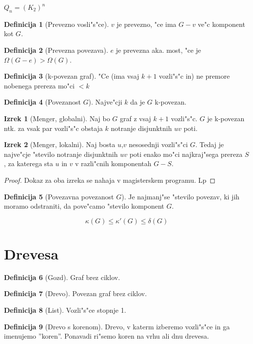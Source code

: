 \documentclass{article}
\theoremstyle{definition}
\newtheorem{definition}{Definicija}[section]
\newtheorem{theorem}{Izrek}[section]
\begin{document}
	$Q_n = (K_2)^n$
	
	\begin{definition}[Prevezno vosli"s"ce]
		$v$ je prevezno, "ce ima $G-v$ ve"c komponent kot $G$.
	\end{definition}
	\begin{definition}[Prevezna povezava]
		$e$ je prevezna aka. most, "ce je $\Omega(G-e) > \Omega(G)$.
	\end{definition}
	\begin{definition}[k-povezan graf]
		"Ce (ima vsaj $k+1$ vozli"s"c in) ne premore nobenega prereza mo"ci $< k$
	\end{definition}
	\begin{definition}[Povezanost $G$]
		Najve"cji $k$ da je $G$ k-povezan. 
	\end{definition}

	\begin{theorem}[Menger, globalni]
		Naj bo $G$ graf z vsaj $k+1$ vozli"s"c. $G$ je k-povezan ntk. za vsak par vozli"s"c obstaja $k$ notranje disjunktnih $uv$ poti.
	\end{theorem} 
	\begin{theorem}[Menger, lokalni]
		Naj bosta $u$,$v$ nesosednji vozli"s"ci $G$. Tedaj je najve"cje "stevilo notranje disjunktnih $uv$ poti enako mo"ci najkraj"sega prereza $S$, za katerega sta $u$ in $v$ v razli"cnih komponentah $G-S$.
	\end{theorem}
	\begin{proof}
		Dokaz za oba izreka se nahaja v magisterskem programu. Lp
	\end{proof}
	
	\begin{definition}[Povezavna povezanost $G$]
		Je najmanj"se "stevilo povezav, ki jih moramo odstraniti, da pove"camo "stevilo komponent $G$.
	\end{definition}

	\[ \kappa (G) \leq \kappa '(G) \leq \delta(G) \]
	
	\section{Drevesa}
	\begin{definition}[Gozd]
		Graf brez ciklov.
	\end{definition}
	\begin{definition}[Drevo]
		Povezan graf brez ciklov.
	\end{definition}
	\begin{definition}[List]
		Vozli"s"ce stopnje 1.
	\end{definition}
	\begin{definition}[Drevo s korenom]
		Drevo, v katerm izberemo vozli"s"ce in ga imenujemo ''koren''. Ponavadi ri"semo koren na vrhu ali dnu drevesa.
	\end{definition}
	
\end{document}
